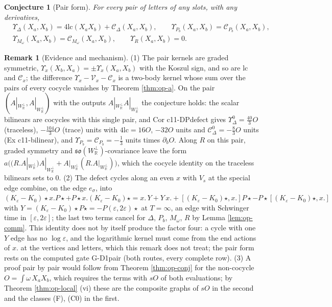 \documentclass[11pt]{article}
\numberwithin{equation}{section}
\theoremstyle{plain}
\newtheorem{conjecture}[theorem]{Conjecture}
\theoremstyle{definition}
\newtheorem{remark}[theorem]{Remark}
\newcommand{\Ap}{A|_{W_{\mathbb R}^\perp}}
\newcommand{\lc}{\mathrm{lc}}
\newcommand{\Pst}{P\star}
\newcommand{\Comp}{\mathcal C}
\newcommand{\Var}{\mathcal V}
\begin{document}
\begin{conjecture}[Pair form]
\label{conj:op-pair}
For every pair of letters of any slots, with any derivatives,
\[
\begin{aligned}
&\Upsilon_\Delta(X_a,X_b)=4\lc(X_aX_b)+\Comp_\Delta(X_a,X_b),\qquad \Upsilon_{P_b}(X_a,X_b)=\Comp_{P_b}(X_a,X_b),\\
&\Upsilon_{M_\omega}(X_a,X_b)=\Comp_{M_\omega}(X_a,X_b),\qquad\Upsilon_R(X_a,X_b)=0 .
\end{aligned}
\]
\end{conjecture}

\begin{remark}[Evidence and mechanism]
\label{rem:op-pair}
(1) The pair kernels are graded symmetric, $\Upsilon_x(X_b,X_a)=\pm\Upsilon_x(X_a,X_b)$ with the Koszul sign, and so are $\lc$ and $\Comp_x$; the difference $\Upsilon_x-\Var_x-\Comp_x$ is a two-body kernel whose sum over the pairs of every cocycle vanishes by Theorem \ref{thm:op-a}. On the pair $(\Ap,\Ap)$ with the outputs $\Ap\Ap$ the conjecture holds: the scalar bilinears are cocycles with this single pair, and Cor c11-DPdefect gives $\Upsilon^0_\Delta=\tfrac{40}3O$ (traceless), $-\tfrac{104}3O$ (trace) units with $4\lc=16O$, $-32O$ units and $\Comp^0_\Delta=-\tfrac83O$ units (Ex c11-bilinear), and $\Upsilon_{P_b}=\Comp_{P_b}=-\tfrac13$ units times $\partial_bO$. Along $R$ on this pair, graded symmetry and $\mathfrak{so}(W_{\mathbb R}^\perp)$-covariance leave the form $a\big((R.\Ap)\Ap+\Ap(R.\Ap)\big)$, which the cocycle identity on the traceless bilinears sets to $0$. (2) The defect cycles along an even $x$ with $V_s$ at the special edge combine, on the edge $e_\sigma$, into $(K_\varepsilon-K_0)\star x.\Pst+\Pst x.(K_\varepsilon-K_0)\star=x.\,Y+Y\,x.+[(K_\varepsilon-K_0)\star,x.]\Pst-\Pst[(K_\varepsilon-K_0)\star,x.]$ with $Y=(K_\varepsilon-K_0)\star\Pst=-P(\varepsilon,2\varepsilon)\star$ at $T=\infty$, an edge with Schwinger time in $[\varepsilon,2\varepsilon]$; the last two terms cancel for $\Delta$, $P_b$, $M_\omega$, $R$ by Lemma \ref{lem:op-comm}. This identity does not by itself produce the factor four: a cycle with one $Y$ edge has no $\log\varepsilon$, and the logarithmic kernel must come from the end actions of $x.$ at the vertices and letters, which this remark does not treat; the pair form rests on the computed gate G-D1pair (both routes, every complete row). (3) A proof pair by pair would follow from Theorem \ref{thm:op-conj} for the non-cocycle $O=\int\omega\,X_aX_b$, which requires the terms with $sO$ of both evaluations; by Theorem \ref{thm:op-local} (vi) these are the composite graphs of $sO$ in the second and the classes (F), (C0) in the first.
\end{remark}
\end{document}
